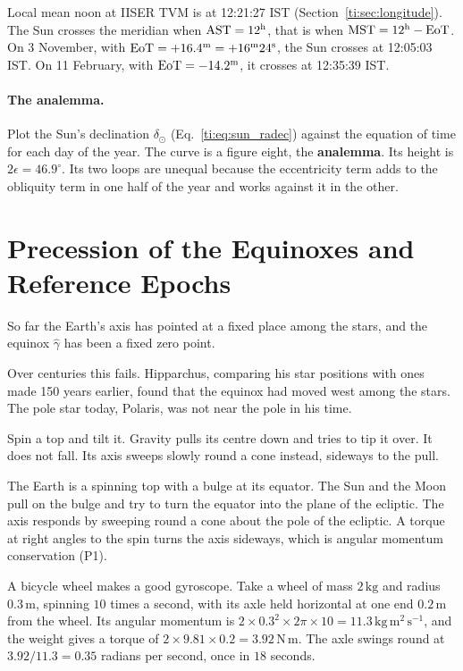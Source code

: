 \begin{example}
	Local mean noon at IISER TVM is at 12:21:27 IST (Section~\ref{ti:sec:longitude}). The Sun crosses the meridian when $\mathrm{AST}=12^{\rm h}$, that is when $\mathrm{MST}=12^{\rm h}-\mathrm{EoT}$. On 3 November, with $\mathrm{EoT}=+16.4^{\rm m}=+16^{\rm m}24^{\rm s}$, the Sun crosses at 12:05:03 IST. On 11 February, with $\mathrm{EoT}=-14.2^{\rm m}$, it crosses at 12:35:39 IST.
\end{example}

\paragraph{The analemma.} Plot the Sun's declination $\delta_\odot$ (Eq.~\eqref{ti:eq:sun_radec}) against the equation of time for each day of the year. The curve is a figure eight, the \textbf{analemma}. Its height is $2\epsilon=46.9^\circ$. Its two loops are unequal because the eccentricity term adds to the obliquity term in one half of the year and works against it in the other.

\section{Precession of the Equinoxes and Reference Epochs}
\label{ti:sec:precession}

So far the Earth's axis has pointed at a fixed place among the stars, and the equinox $\hat\gamma$ has been a fixed zero point.

Over centuries this fails. Hipparchus, comparing his star positions with ones made 150 years earlier, found that the equinox had moved west among the stars. The pole star today, Polaris, was not near the pole in his time.

Spin a top and tilt it. Gravity pulls its centre down and tries to tip it over. It does not fall. Its axis sweeps slowly round a cone instead, sideways to the pull.

The Earth is a spinning top with a bulge at its equator. The Sun and the Moon pull on the bulge and try to turn the equator into the plane of the ecliptic. The axis responds by sweeping round a cone about the pole of the ecliptic. A torque at right angles to the spin turns the axis sideways, which is angular momentum conservation (P1).

A bicycle wheel makes a good gyroscope. Take a wheel of mass $2\,\mathrm{kg}$ and radius $0.3\,\mathrm m$, spinning $10$ times a second, with its axle held horizontal at one end $0.2\,\mathrm m$ from the wheel. Its angular momentum is $2\times0.3^2\times2\pi\times10=11.3\,\mathrm{kg\,m^2\,s^{-1}}$, and the weight gives a torque of $2\times9.81\times0.2=3.92\,\mathrm{N\,m}$. The axle swings round at $3.92/11.3=0.35$ radians per second, once in $18$ seconds.

